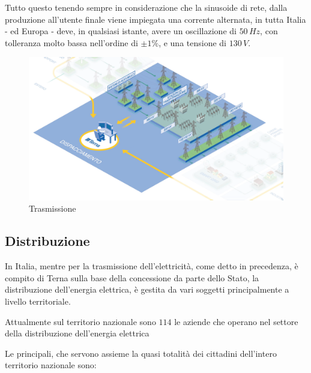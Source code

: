 Tutto questo tenendo sempre in considerazione che la sinusoide di rete, dalla produzione all'utente finale viene impiegata una corrente alternata, in tutta Italia - ed Europa - deve, in qualsiasi istante, avere un oscillazione di $50\,Hz$, con tolleranza molto bassa nell'ordine di $\pm1\%$, e una tensione di $130\,V$.

\begin{figure}[h!]
    \centering
    \includegraphics[width=0.9\linewidth]{img/Terna-Trasmissione.png}
    \caption{Trasmissione}
\end{figure}



\newpage
\subsection{Distribuzione}

In Italia, mentre per la trasmissione dell'elettricità, come detto in precedenza, è compito di Terna sulla base della concessione da parte dello Stato, la distribuzione dell'energia elettrica, è gestita da vari soggetti principalmente a livello territoriale.

Attualmente sul territorio nazionale sono $114$ le aziende \cite{arera-distributori} che operano nel settore della distribuzione dell'energia elettrica

Le principali, che servono assieme la quasi totalità dei cittadini dell'intero territorio nazionale sono:

